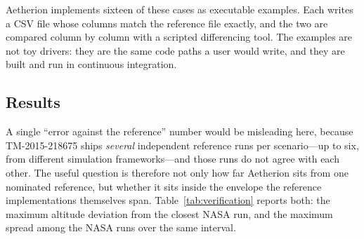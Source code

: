 \documentclass[a4paper,10pt]{article}
\theoremstyle{definition}
\begin{document}
Aetherion implements sixteen of these cases as executable examples.  Each
writes a CSV file whose columns match the reference file exactly, and the two
are compared column by column with a scripted differencing tool.  The examples
are not toy drivers: they are the same code paths a user would write, and they
are built and run in continuous integration.

\subsection{Results}

A single ``error against the reference'' number would be misleading here,
because TM-2015-218675 ships \emph{several} independent reference runs per
scenario---up to six, from different simulation frameworks---and those runs
do not agree with each other.  The useful question is therefore not only how
far Aetherion sits from one nominated reference, but whether it sits inside
the envelope the reference implementations themselves span.
Table~\ref{tab:verification} reports both: the maximum altitude deviation from
the closest NASA run, and the maximum spread among the NASA runs over the same
interval.
\end{document}
